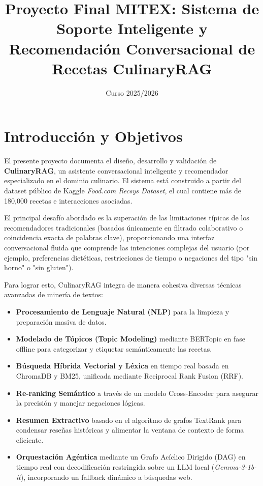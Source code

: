 \documentclass[11pt,a4paper]{article}
\title{\textbf{Proyecto Final MITEX: Sistema de Soporte Inteligente y Recomendación Conversacional de Recetas CulinaryRAG}}
\author{}
\date{Curso 2025/2026}
\begin{document}
\maketitle
\newpage
\tableofcontents
\newpage

\section{Introducción y Objetivos}
El presente proyecto documenta el diseño, desarrollo y validación de \textbf{CulinaryRAG}, un asistente conversacional inteligente y recomendador especializado en el dominio culinario. El sistema está construido a partir del dataset público de Kaggle \textit{Food.com Recsys Dataset}, el cual contiene más de 180,000 recetas e interacciones asociadas. 

El principal desafío abordado es la superación de las limitaciones típicas de los recomendadores tradicionales (basados únicamente en filtrado colaborativo o coincidencia exacta de palabras clave), proporcionando una interfaz conversacional fluida que comprende las intenciones complejas del usuario (por ejemplo, preferencias dietéticas, restricciones de tiempo o negaciones del tipo "sin horno" o "sin gluten"). 

Para lograr esto, CulinaryRAG integra de manera cohesiva diversas técnicas avanzadas de minería de textos:
\begin{itemize}
    \item \textbf{Procesamiento de Lenguaje Natural (NLP)} para la limpieza y preparación masiva de datos.
    \item \textbf{Modelado de Tópicos (Topic Modeling)} mediante BERTopic en fase offline para categorizar y etiquetar semánticamente las recetas.
    \item \textbf{Búsqueda Híbrida Vectorial y Léxica} en tiempo real basada en ChromaDB y BM25, unificada mediante Reciprocal Rank Fusion (RRF).
    \item \textbf{Re-ranking Semántico} a través de un modelo Cross-Encoder para asegurar la precisión y manejar negaciones lógicas.
    \item \textbf{Resumen Extractivo} basado en el algoritmo de grafos TextRank para condensar reseñas históricas y alimentar la ventana de contexto de forma eficiente.
    \item \textbf{Orquestación Agéntica} mediante un Grafo Acíclico Dirigido (DAG) en tiempo real con decodificación restringida sobre un LLM local (\textit{Gemma-3-1b-it}), incorporando un fallback dinámico a búsquedas web.
\end{itemize}
\end{document}
